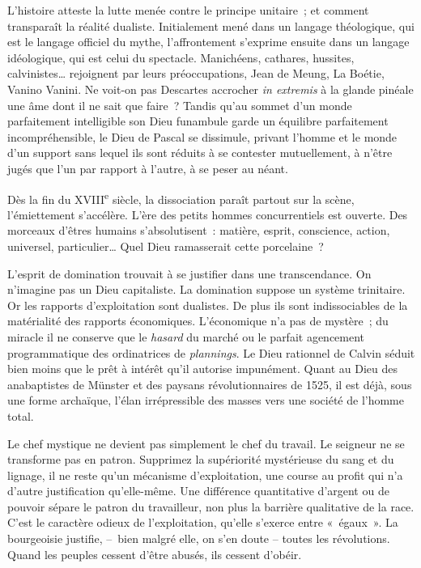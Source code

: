 \documentclass[french,twoside]{book} %
\begin{document}
\noindent L’histoire atteste la lutte menée contre le principe unitaire ; et comment transparaît la réalité dualiste. Initialement mené dans un langage théologique, qui est le langage officiel du mythe, l’affrontement s’exprime ensuite dans un langage idéologique, qui est celui du spectacle. Manichéens, cathares, hussites, calvinistes… rejoignent par leurs préoccupations, Jean de Meung, La Boétie, Vanino Vanini. Ne voit-on pas Descartes accrocher \emph{in extremis} à la glande pinéale une âme dont il ne sait que faire ? Tandis qu’au sommet d’un monde parfaitement intelligible son Dieu funambule garde un équilibre parfaitement incompréhensible, le Dieu de Pascal se dissimule, privant l’homme et le monde d’un support sans lequel ils sont réduits à se contester mutuellement, à n’être jugés que l’un par rapport à l’autre, à se peser au néant.\par
Dès la fin du XVIII\textsuperscript{e} siècle, la dissociation paraît partout sur la scène, l’émiettement s’accélère. L’ère des petits hommes concurrentiels est ouverte. Des morceaux d’êtres humains s’absolutisent : matière, esprit, conscience, action, universel, particulier… Quel Dieu ramasserait cette porcelaine ?\par
L’esprit de domination trouvait à se justifier dans une transcendance. On n’imagine pas un Dieu capitaliste. La domination suppose un système trinitaire. Or les rapports d’exploitation sont dualistes. De plus ils sont indissociables de la matérialité des rapports économiques. L’économique n’a pas de mystère ; du miracle il ne conserve que le \emph{hasard} du marché ou le parfait agencement programmatique des ordinatrices de \emph{plannings}. Le Dieu rationnel de Calvin séduit bien moins que le prêt à intérêt qu’il autorise impunément. Quant au Dieu des anabaptistes de Münster et des paysans révolutionnaires de 1525, il est déjà, sous une forme archaïque, l’élan irrépressible des masses vers une société de l’homme total.\par
Le chef mystique ne devient pas simplement le chef du travail. Le seigneur ne se transforme pas en patron. Supprimez la supériorité mystérieuse du sang et du lignage, il ne reste qu’un mécanisme d’exploitation, une course au profit qui n’a d’autre justification qu’elle-même. Une différence quantitative d’argent ou de pouvoir sépare le patron du travailleur, non plus la barrière qualitative de la race. C’est le caractère odieux de l’exploitation, qu’elle s’exerce entre « égaux ». La bourgeoisie justifie, – bien malgré elle, on s’en doute – toutes les révolutions. Quand les peuples cessent d’être abusés, ils cessent d’obéir.\par
\end{document}
